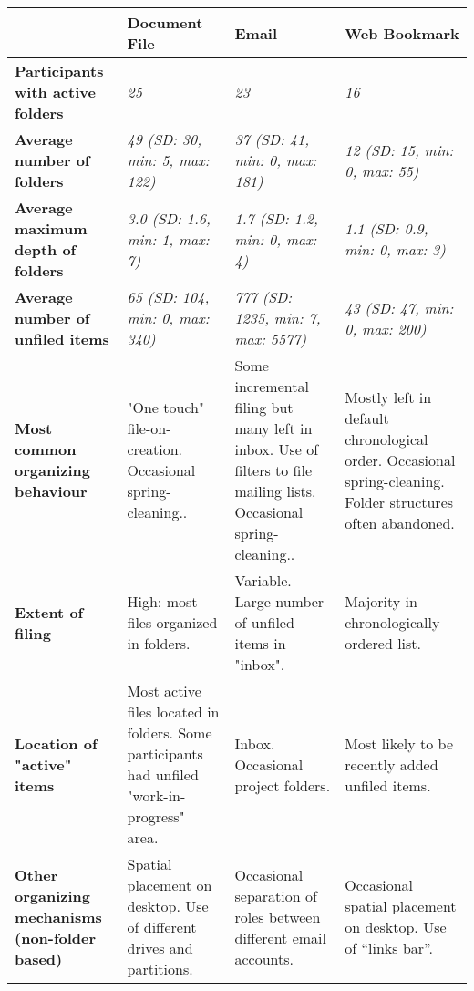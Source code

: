\begin{table}[hbtp]
\begin{center}
\begin{footnotesize}
\setlength{\extrarowheight}{2pt}
\begin{tabular}{|p{2.5cm}|p{3.5cm}|p{3.5cm}|p{3.5cm}|}
\hline
    {\bf } & {\bf Document File} & {\bf Email} & {\bf Web Bookmark} \\
\hline
{\bf Participants with active folders} &   {\it 25} &   {\it 23} &   {\it 16} \\
\hline
{\bf Average number of folders} & {\it 49 (SD: 30, min: 5, max: 122)} & {\it 37 (SD: 41, min: 0, max: 181)} & {\it 12 (SD: 15, min: 0, max: 55)} \\
\hline
{\bf Average maximum depth of folders} & {\it 3.0 (SD: 1.6, min: 1, max: 7)} & {\it 1.7 (SD: 1.2, min: 0, max: 4)} & {\it 1.1 (SD: 0.9, min: 0, max: 3)} \\
\hline
{\bf Average number of unfiled items} & {\it 65 (SD: 104, min: 0, max: 340)} & {\it 777 (SD: 1235, min: 7, max: 5577)} & {\it 43 (SD: 47, min: 0, max: 200)} \\
\hline
{\bf Most common organizing behaviour} & "One touch" file-on-creation. Occasional spring-cleaning..  & Some incremental filing but many left in inbox.  Use of filters to file mailing lists. Occasional spring-cleaning..  & Mostly left in default chronological order. Occasional spring-cleaning. Folder structures often abandoned. \\
\hline
{\bf Extent of filing} & High: most files organized in folders. & Variable. Large number of unfiled items in "inbox". & Majority in chronologically ordered list. \\
\hline
{\bf Location of "active" items} & Most active files located in folders. Some participants had unfiled "work-in-progress" area. & Inbox. Occasional project folders. & Most likely to be recently added unfiled items. \\
\hline
{\bf Other  organizing mechanisms (non-folder based) } & Spatial placement on desktop. Use of different  drives and partitions. & Occasional separation of roles between different email accounts. & Occasional spatial placement on desktop. Use of ``links bar''. \\

\end{tabular}
\end{footnotesize}
\end{center}
\end{table}

